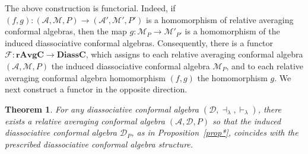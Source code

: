 \documentclass[a4paper,reqno,10pt]{amsart}
\theoremstyle{plain}
\newtheorem{thm}{Theorem}[section]
\theoremstyle{definition}
\theoremstyle{remark}
\newcommand{\la}{\lambda}
\begin{document}
The above construction is functorial. Indeed, if
$(f,g):(\mathcal{A},\mathcal{M},P)\rightarrow(\mathcal{A}',\mathcal{M}',P')$
is a homomorphism of relative averaging conformal algebras, then the map $g: \mathcal{M}_{P}\rightarrow\mathcal{M}'_{P'}$ is a homomorphism of the induced diassociative conformal algebras. Consequently, there is a functor $\mathcal{F}:\mathbf{rAvgC} \rightarrow\mathbf{DiassC}$, which assigns to each relative averaging conformal algebra
$(\mathcal{A},\mathcal{M},P)$ the induced diassociative conformal algebra
$\mathcal{M}_{P}$, and to each relative averaging conformal algebra homomorphism $(f,g)$ the homomorphism $g$. We next construct a functor in the opposite direction.

\begin{thm}\label{thm-diass-to-avg}
For any diassociative conformal algebra $(\mathcal{D},\dashv_{\la},\vdash_{\la})$, there exists a relative averaging conformal algebra $(\mathcal{A}, \mathcal{D}, P)$ so that the induced diassociative conformal algebra $ \mathcal{D}_P$, as in Proposition~\ref{prop*}, coincides with the prescribed diassociative conformal algebra structure.
\end{thm}
\end{document}
